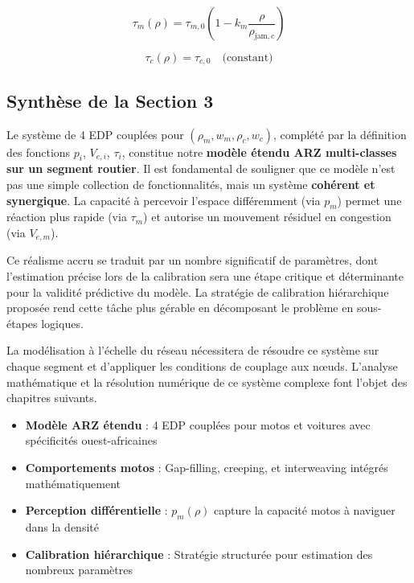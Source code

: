 \begin{equation}
    \tau_m(\rho) = \tau_{m,0} \left(1 - k_m \frac{\rho}{\rho_{\text{jam},c}}\right)
\end{equation}

\begin{equation}
    \tau_c(\rho) = \tau_{c,0} \quad \text{(constant)}
\end{equation}

\subsection{Synthèse de la Section 3}
Le système de 4 EDP couplées pour $(\rho_m, w_m, \rho_c, w_c)$, complété par la définition des fonctions $p_i$, $V_{e,i}$, $\tau_i$, constitue notre \textbf{modèle étendu ARZ multi-classes sur un segment routier}. Il est fondamental de souligner que ce modèle n'est pas une simple collection de fonctionnalités, mais un système \textbf{cohérent et synergique}. La capacité à percevoir l'espace différemment (via $p_m$) permet une réaction plus rapide (via $\tau_m$) et autorise un mouvement résiduel en congestion (via $V_{e,m}$).

Ce réalisme accru se traduit par un nombre significatif de paramètres, dont l'estimation précise lors de la calibration sera une étape critique et déterminante pour la validité prédictive du modèle. La stratégie de calibration hiérarchique proposée rend cette tâche plus gérable en décomposant le problème en sous-étapes logiques.

La modélisation à l'échelle du réseau nécessitera de résoudre ce système sur chaque segment et d'appliquer les conditions de couplage aux nœuds. L'analyse mathématique et la résolution numérique de ce système complexe font l'objet des chapitres suivants.

\begin{keypointsbox}
    \begin{itemize}
        \item \textbf{Modèle ARZ étendu} : 4 EDP couplées pour motos et voitures avec spécificités ouest-africaines
        \item \textbf{Comportements motos} : Gap-filling, creeping, et interweaving intégrés mathématiquement
        \item \textbf{Perception différentielle} : $p_m(\rho)$ capture la capacité motos à naviguer dans la densité
        \item \textbf{Calibration hiérarchique} : Stratégie structurée pour estimation des nombreux paramètres
    \end{itemize}
\end{keypointsbox}